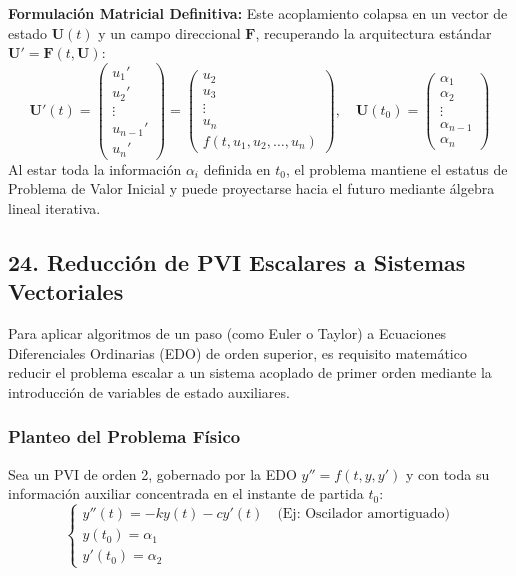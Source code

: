 \documentclass[12pt]{article}
\begin{document}
\textbf{Formulación Matricial Definitiva:}
Este acoplamiento colapsa en un vector de estado $\mathbf{U}(t)$ y un campo direccional $\mathbf{F}$, recuperando la arquitectura estándar $\mathbf{U}' = \mathbf{F}(t, \mathbf{U})$:
\begin{equation}
\mathbf{U}'(t) = 
\begin{pmatrix}
    u_1' \\ u_2' \\ \vdots \\ u_{n-1}' \\ u_n'
\end{pmatrix}
=
\begin{pmatrix}
    u_2 \\ u_3 \\ \vdots \\ u_n \\ f(t, u_1, u_2, \dots, u_n)
\end{pmatrix},
\quad
\mathbf{U}(t_0) = 
\begin{pmatrix}
    \alpha_1 \\ \alpha_2 \\ \vdots \\ \alpha_{n-1} \\ \alpha_n
\end{pmatrix}
\end{equation}
Al estar toda la información $\alpha_i$ definida en $t_0$, el problema mantiene el estatus de Problema de Valor Inicial y puede proyectarse hacia el futuro mediante álgebra lineal iterativa.

\vspace{0.5cm}
\subsection*{24. Reducción de PVI Escalares a Sistemas Vectoriales}

Para aplicar algoritmos de un paso (como Euler o Taylor) a Ecuaciones Diferenciales Ordinarias (EDO) de orden superior, es requisito matemático reducir el problema escalar a un sistema acoplado de primer orden mediante la introducción de variables de estado auxiliares.

\subsubsection*{Planteo del Problema Físico}
Sea un PVI de orden 2, gobernado por la EDO $y'' = f(t, y, y')$ y con toda su información auxiliar concentrada en el instante de partida $t_0$:
\begin{equation}
\begin{cases}
    y''(t) = -ky(t) - cy'(t) \quad \text{(Ej: Oscilador amortiguado)} \\
    y(t_0) = \alpha_1 \\
    y'(t_0) = \alpha_2
\end{cases}
\end{equation}
\end{document}
